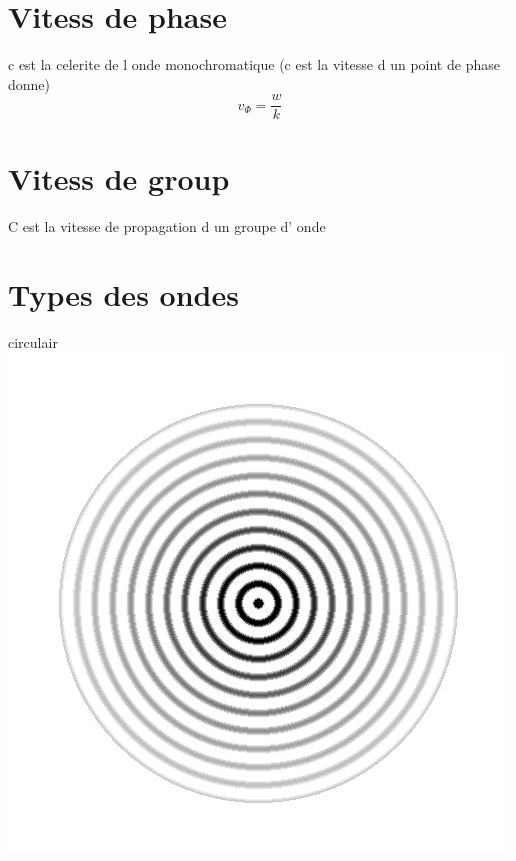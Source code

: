 \documentclass[12pt]{book}
\begin{document}
        \section{Vitess de phase}
            c est la celerite de l onde monochromatique  (c est la vitesse d un point de phase donne)
            \[v_\varPhi = \frac{w}{k}\]
        \section{Vitess de group}
            C est la vitesse de propagation d un groupe d' onde 
        \section{Types des ondes}
            \begin{minipage}{0.49\linewidth}
                circulair \\
                \includegraphics[width =\linewidth]{pic/circluair.jpg}
            \end{minipage}
\end{document}
